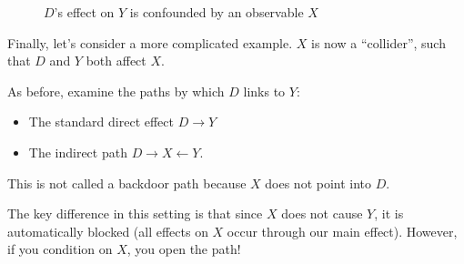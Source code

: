\documentclass{tufte-handout}
\theoremstyle{break}
\begin{document}
\begin{figure}
\begin{center}
\end{center}
\caption{$D$'s effect on $Y$ is confounded by an observable $X$}
\end{figure}

Finally, let's consider a more complicated example. $X$ is now a ``collider'', such that $D$ and $Y$ both affect $X$. 

\begin{figure}
  \begin{center}
  \end{center}
\end{figure}

As before, examine the paths by which $D$ links to $Y$:
    \begin{itemize}
    \item The standard direct effect $D \rightarrow Y$
    \item The indirect path $D \rightarrow X \leftarrow Y$.
    \end{itemize}
This is not called a backdoor path because $X$ does not point into $D$.  

The key difference in this setting is that since $X$ does not cause $Y$, it is automatically blocked (all effects on $X$ occur through our main effect). However, if you condition on $X$, you open the path! 
\end{document}
